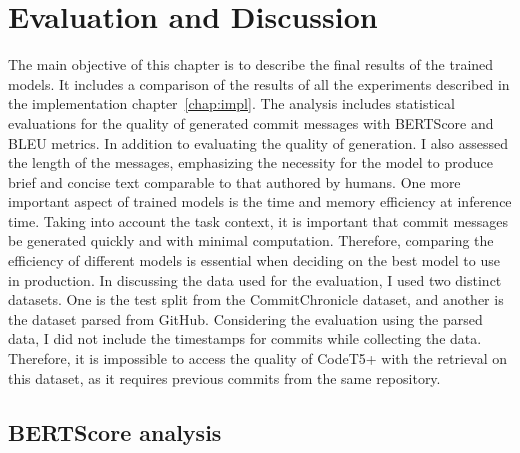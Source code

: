 \chapter{Evaluation and Discussion}\label{chap:eval}
The main objective of this chapter is to describe the final results of the trained models. It includes a comparison of the results of all the experiments described in the implementation chapter~\ref{chap:impl}. The analysis includes statistical evaluations for the quality of generated commit messages with BERTScore and BLEU metrics. In addition to evaluating the quality of generation. I also assessed the length of the messages, emphasizing the necessity for the model to produce brief and concise text comparable to that authored by humans. One more important aspect of trained models is the time and memory efficiency at inference time. Taking into account the task context, it is important that commit messages be generated quickly and with minimal computation. Therefore, comparing the efficiency of different models is essential when deciding on the best model to use in production.
In discussing the data used for the evaluation, I used two distinct datasets. One is the test split from the CommitChronicle dataset, and another is the dataset parsed from GitHub.
Considering the evaluation using the parsed data, I did not include the timestamps for commits while collecting the data. Therefore, it is impossible to access the quality of CodeT5+ with the retrieval on this dataset, as it requires previous commits from the same repository.  
\setcounter{table}{7}
\section{BERTScore analysis}\label{sec:bertscore_res}

